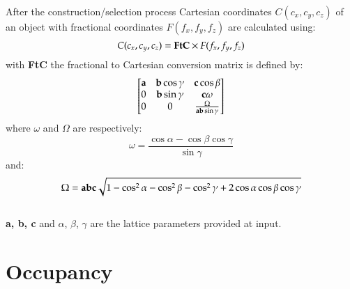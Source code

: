 After the construction/selection process Cartesian coordinates $C(c_x, c_y, c_z)$ of an object with fractional coordinates $F(f_x, f_y, f_z)$ are calculated using:
\begin{equation}
C(c_x, c_y, c_z) = {\bf{FtC}} \times F(f_x, f_y, f_z)
\end{equation}
with {\bf{FtC}} the fractional to Cartesian conversion matrix is defined by:
\begin{equation}
\begin{bmatrix}
 \bf{a} & \bf{b}\cos{\gamma}  & \bf{c}\cos{\beta} \\
 0 & \bf{b}\sin{\gamma} & \bf{c}\omega \\
 0 & 0 & \frac{\Omega}{\bf{ab}\sin{\gamma}}
\end{bmatrix}
\end{equation}
where $\omega$ and $\Omega$ are respectively: 
\begin{equation}
\omega = \frac{\cos{\alpha} - \cos{\beta}\cos{\gamma}}{\sin{\gamma}} 
\end{equation}
and:
\begin{equation}
\Omega = \bf{abc}\sqrt{1-\cos^2{\alpha} -\cos^2{\beta} -\cos^2{\gamma} + 2\cos{\alpha}\cos{\beta}\cos{\gamma}}
\end{equation}
\\
{\bf{a, b, c}} and $\alpha$, $\beta$, $\gamma$ are the lattice parameters provided at input. 

\newpage

\section*{Occupancy}

